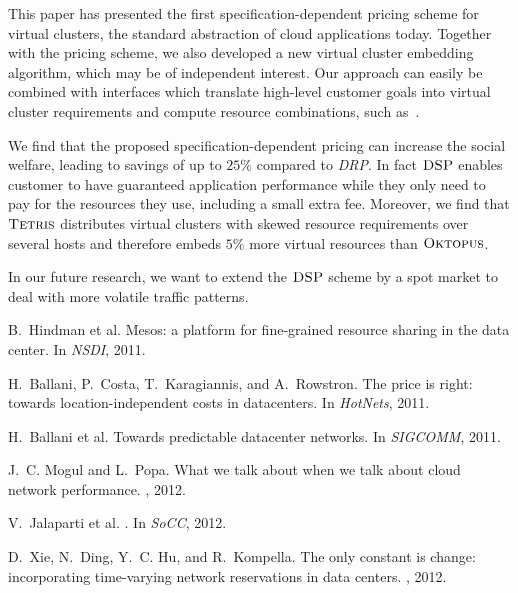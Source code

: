 \documentclass{sig-alternate-per}
\newcommand{\ALG}{\textsc{Tetris}}
\newcommand{\OKTO}{\textsc{Oktopus}}
\newcommand{\pricing}{\textsc{DSP}}
\begin{document}
This paper has presented the first specification-dependent pricing scheme for virtual clusters,
the standard abstraction of cloud applications today. Together with the pricing scheme,
we also developed a new virtual cluster embedding algorithm, which may be of independent interest.
Our approach can easily be combined with interfaces which translate high-level
customer goals into virtual cluster requirements and compute
resource combinations, such as~\cite{short-gapbridge}.

We find that the proposed specification-dependent pricing can increase the social welfare,
leading to savings of up to
$25\%$ compared to \emph{DRP}. In fact $\pricing$ enables customer to have guaranteed application performance while they
only need to pay for the resources they use, including a small extra fee.
Moreover, we find that $\ALG$ distributes virtual clusters with skewed resource requirements over several
hosts and therefore embeds $5\%$ more virtual resources than $\OKTO$.

In our future research, we want to extend the $\pricing$ scheme
by a spot market to deal with more volatile traffic patterns.

\vspace{-5pt}
\begin{thebibliography}{1}
\footnotesize
{B.~Hindman et al.}
\newblock Mesos: a platform for fine-grained resource sharing in the data
  center.
\newblock In {\em NSDI}, 2011.

H.~Ballani, P.~Costa, T.~Karagiannis, and A.~Rowstron.
\newblock The price is right: towards location-independent costs in
  datacenters.
\newblock In {\em HotNets}, 2011.

{H.~Ballani et al.}
\newblock Towards predictable datacenter networks.
\newblock In {\em SIGCOMM}, 2011.

J.~C. Mogul and L.~Popa.
\newblock What we talk about when we talk about cloud network performance.
, 2012.

{V.~Jalaparti et al.}
.
\newblock In {\em SoCC}, 2012.

D.~Xie, N.~Ding, Y.~C. Hu, and R.~Kompella.
\newblock The only constant is change: incorporating time-varying network
  reservations in data centers.
, 2012.
\end{thebibliography}
\end{document}
